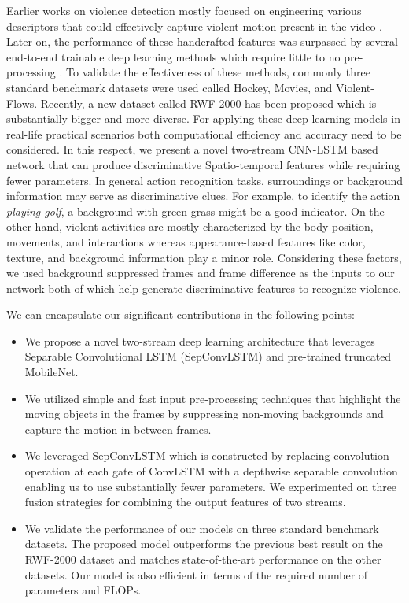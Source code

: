 \documentclass[conference]{IEEEtran}
\begin{document}
Earlier works on violence detection mostly focused on engineering various descriptors that could effectively capture violent motion present in the video \cite{Senst2017CrowdVD, article,8614186}. Later on, the performance of these handcrafted features was surpassed by several end-to-end trainable deep learning methods which require little to no pre-processing \cite{li2019efficient,sudhakaran2017learning,hanson2018bidirectional}. To validate the effectiveness of these methods, commonly three standard benchmark datasets were used called Hockey, Movies, and Violent-Flows. Recently, a new dataset called RWF-2000 has been proposed which is substantially bigger and more diverse. For applying these deep learning models in real-life practical scenarios both computational efficiency and accuracy need to be considered. In this respect, we present a novel two-stream CNN-LSTM based network that can produce discriminative Spatio-temporal features while requiring fewer parameters. In general action recognition tasks, surroundings or background information may serve as discriminative clues. For example, to identify the action \emph{playing golf}, a background with green grass might be a good indicator. On the other hand, violent activities are mostly characterized by the body position, movements, and interactions whereas appearance-based features like color, texture, and background information play a minor role. Considering these factors, we used background suppressed frames and frame difference as the inputs to our network both of which help generate discriminative features to recognize violence.




We can encapsulate our significant contributions in the following points:
\begin{itemize}
    \item We propose a novel two-stream deep learning architecture that leverages Separable Convolutional LSTM (SepConvLSTM) and pre-trained truncated MobileNet. 
    \item We utilized simple and fast input pre-processing techniques that highlight the moving objects in the frames by suppressing non-moving backgrounds and capture the motion in-between frames.
    \item We leveraged SepConvLSTM which is constructed by replacing convolution operation at each gate of ConvLSTM with a depthwise separable convolution enabling us to use substantially fewer parameters. We experimented on three fusion strategies for combining the output features of two streams.
    \item We validate the performance of our models on three standard benchmark datasets. The proposed model outperforms the previous best result on the RWF-2000 dataset and matches state-of-the-art performance on the other datasets. Our model is also efficient in terms of the required number of parameters and FLOPs.
\end{itemize}
\end{document}
